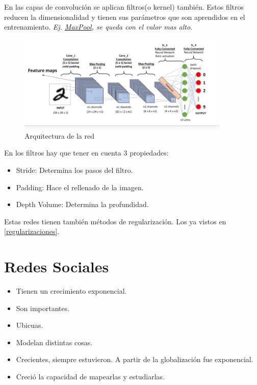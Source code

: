 \documentclass[titlepage,a4paper]{article}
\begin{document}
En las capas de convolución se aplican filtros(o kernel) también. Estos filtros reducen la dimensionalidad y tienen sus parámetros que son aprendidos en el entrenamiento. \textit{Ej. \href{https://developers.google.com/machine-learning/practica/image-classification/images/maxpool_animation.gif?hl=es}{MaxPool}, se queda con el valor mas alto}.

\begin{figure}[!htb]
    \centering
    \includegraphics[width=0.9\textwidth]{imagenesResumen/ArquitecturaRedConvolucional.PNG}
    \caption{Arquitectura de la red}
\end{figure}

En los filtros hay que tener en cuenta 3 propiedades:
\begin{itemize}
    \item Stride: Determina los pasos del filtro.
    \item Padding: Hace el rellenado de la imagen.
    \item Depth Volume: Determina la profundidad.
\end{itemize}

Estas redes tienen también métodos de regularización. Los ya vistos en \ref{regularizaciones}.

\newpage

\section{Redes Sociales}
\begin{itemize}
    \item Tienen un crecimiento exponencial.
    \item Son importantes.
    \item Ubicuas.
    \item Modelan distintas cosas.
    \item Crecientes, siempre estuvieron. A partir de la globalización fue exponencial.
    \item Creció la capacidad de mapearlas y estudiarlas.
\end{itemize}
\end{document}
